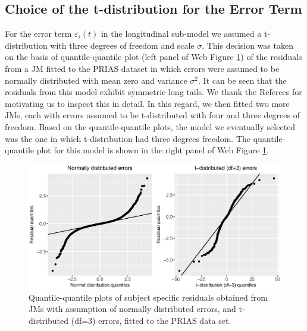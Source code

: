 \subsection{Choice of the t-distribution for the Error Term}
\label{subsec : t_dist_choice}
For the error term $\varepsilon_i(t)$ in the longitudinal sub-model we assumed a t-distribution with three degrees of freedom and scale $\sigma$. This decision was taken on the basis of quantile-quantile plot (left panel of Web Figure \ref{fig : qqplot_norm_t3_web}) of the residuals from a JM fitted to the PRIAS dataset in which errors were assumed to be normally distributed with mean zero and variance $\sigma^2$. It can be seen that the residuals from this model exhibit symmetric long tails. We thank the Referees for motivating us to inspect this in detail. In this regard, we then fitted two more JMs, each with errors assumed to be t-distributed with four and three degrees of freedom. Based on the quantile-quantile plots, the model we eventually selected was the one in which t-distribution had three degrees freedom. The quantile-quantile plot for this model is shown in the right panel of Web Figure \ref{fig : qqplot_norm_t3_web}.

\begin{figure}[!htb]
\centerline{\includegraphics[width=\columnwidth]{images/model_fit/qqplot_norm_t3.eps}}
\caption{Quantile-quantile plots of subject specific residuals obtained from JMs with assumption of normally distributed errors, and t-distributed (df=3) errors, fitted to the PRIAS data set.}
\label{fig : qqplot_norm_t3_web}
\end{figure}

\clearpage

